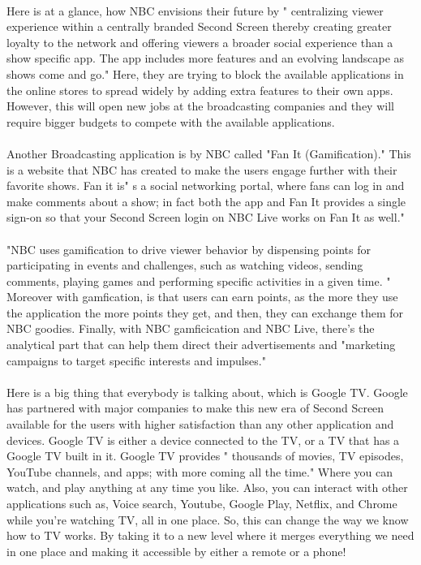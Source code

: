 \documentclass[12pt, oneside]{article}   	%
\begin{document}
 \paragraph{}
Here is at a glance, how NBC envisions their future by " centralizing viewer experience within a centrally branded Second Screen thereby creating greater loyalty to the network and offering viewers a broader social experience than a show specific app.  The app includes more features and an evolving landscape as shows come and go." \cite{Second-Screen-Art}  Here, they are trying to block the available applications in the online stores to spread widely by adding extra features to their own apps.  However, this will open new jobs at the broadcasting companies and they will require bigger budgets to compete with the available applications.
 \paragraph{}
Another Broadcasting application is by NBC called "Fan It (Gamification)." This is a website that NBC has created to make the users engage further with their favorite shows.  Fan it is" s a social networking portal, where fans can log in and make comments about a show; in fact both the app and Fan It provides a single sign-on so that your Second Screen login on NBC Live works on Fan It as well." \cite{Second-Screen-Art}
  \paragraph{}
"NBC uses gamification to drive viewer behavior by dispensing points for participating in events and 
challenges, such as watching videos, sending comments, playing games and performing specific 
activities in a given time. "\cite{Second-Screen-Art}  Moreover with gamfication, is that users can earn points, as the more they use the application the more points they get, and then, they can exchange them for NBC goodies.  Finally, with NBC gamficication and NBC Live, there's the analytical part that can help them direct their advertisements and "marketing campaigns to target specific interests and 
impulses."\cite{Second-Screen-Art}
  \paragraph{}
Here is a big thing that everybody is talking about, which is Google TV.  Google has partnered with major companies to make this new era of Second Screen available for the users with higher satisfaction than any other application and devices.  Google TV is either a device connected to the TV, or a TV that has a Google TV built in it.  Google TV provides " thousands of movies, TV episodes, YouTube channels, and apps; with more coming all the time."\cite{Google} Where you can watch, and play anything at any time you like. Also, you can interact with other applications such as, Voice search, Youtube, Google Play, Netflix, and Chrome while you're watching TV, all in one place.  So, this can change the way we know how to TV works. By taking it to a new level where it merges everything we need in one place and making it accessible by either a remote or a phone!
\end{document}
